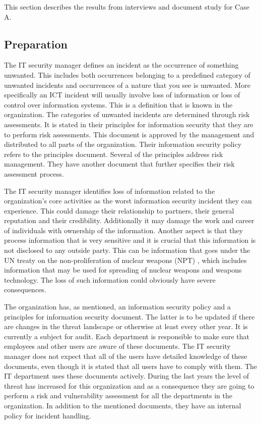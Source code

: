 This section describes the results from interviews and document study for Case A. 

\subsection{Preparation}
The IT security manager defines an incident %
as the occurrence of something unwanted. This includes both occurrences belonging to a predefined category of unwanted incidents and occurrences of a nature that you see is unwanted. More specifically an \ac{ICT} incident will usually involve loss of information or loss of control over information systems. This is a definition that is known in the organization. The categories of unwanted incidents are determined through risk assessments. It is stated in their principles for information security that they are to perform risk assessments. This document is approved by the management and distributed to all parts of the organization. Their information security policy refers to the principles document. Several of the principles address risk management. They have another document that further specifies their risk assessment process. %

The IT security manager identifies loss of information related to the organization's core activities as the worst information security incident they can experience. This could damage their relationship to partners, their general reputation and their credibility. Additionally it may damage the work and career of individuals with ownership of the information. %
Another aspect is that they process information that is very sensitive and it is crucial that this information is not disclosed to any outside party. This can be information that goes under the \ac{UN} treaty on the non-proliferation of nuclear weapons (NPT) \cite{NPT}, which includes information that may be used for spreading of nuclear weapons and weapons technology. %
The loss of such information could obviously have severe consequences.

The organization has, as mentioned, an information security policy and a principles for information security document. The latter is to be updated if there are changes in the threat landscape or otherwise at least every other year. It is currently a subject for audit. Each department is responsible to make sure that employees and other users are aware of these documents. The IT security manager does not expect that all of the users have detailed knowledge of these documents, even though it is stated that all users have to comply with them. The IT department uses these documents actively. %
During the last years the level of threat has increased for this organization and as a consequence they are going to perform a risk and vulnerability assessment for all the departments in the organization. In addition to the mentioned documents, they have an internal policy for incident handling.

